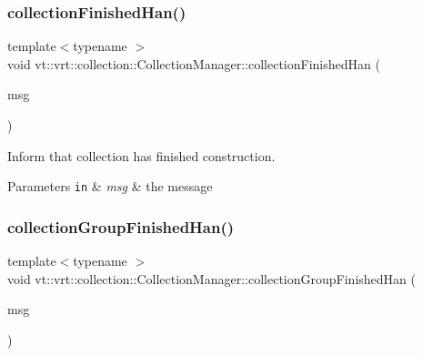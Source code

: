 \subsubsection{\texorpdfstring{collection\+Finished\+Han()}{collectionFinishedHan()}}
{\footnotesize\ttfamily template$<$typename $>$ \\
void vt\+::vrt\+::collection\+::\+Collection\+Manager\+::collection\+Finished\+Han (\begin{DoxyParamCaption}\item[{\hyperlink{structvt_1_1vrt_1_1collection_1_1_collection_cons_msg}{Collection\+Cons\+Msg} $\ast$}]{msg }\end{DoxyParamCaption})\hspace{0.3cm}{\ttfamily [static]}}



Inform that collection has finished construction. 


\begin{DoxyParams}[1]{Parameters}
\mbox{\tt in}  & {\em msg} & the message \\
\hline
\end{DoxyParams}
\mbox{\label{structvt_1_1vrt_1_1collection_1_1_collection_manager_abf80612ba1db9aadf590f837ae4ca7a7}} 
\subsubsection{\texorpdfstring{collection\+Group\+Finished\+Han()}{collectionGroupFinishedHan()}}
{\footnotesize\ttfamily template$<$typename $>$ \\
void vt\+::vrt\+::collection\+::\+Collection\+Manager\+::collection\+Group\+Finished\+Han (\begin{DoxyParamCaption}\item[{\hyperlink{structvt_1_1vrt_1_1collection_1_1_collection_group_msg}{Collection\+Group\+Msg} $\ast$}]{msg }\end{DoxyParamCaption})\hspace{0.3cm}{\ttfamily [static]}}



